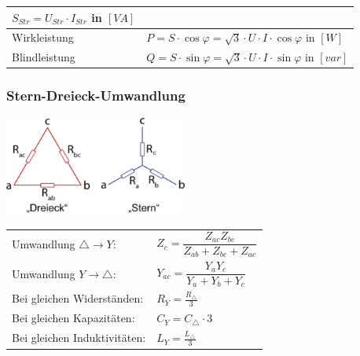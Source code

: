 \begin{tabular}{| p{4.5cm} | l | l |}
            \multicolumn{2}{l|}{\hspace{3cm} $S_{Str} = U_{Str} \cdot I_{Str}$ \hspace{0.2cm} in $[VA]$} \\
            \hline
            Wirkleistung &
            \multicolumn{2}{l|}{\hspace{3cm} $P = S \cdot \cos\varphi = \sqrt{3} \cdot U \cdot I \cdot \cos\varphi$ \hspace{0.2cm} in $[W]$} \\
            \hline
            Blindleistung &
            \multicolumn{2}{l|}{\hspace{3cm} $Q = S \cdot \sin\varphi = \sqrt{3} \cdot U \cdot I \cdot \sin\varphi$ \hspace{0.2cm} in $[var]$} \\
            \hline
        \end{tabular}
        \renewcommand{\arraystretch}{1.5}

    \subsubsection{Stern-Dreieck-Umwandlung}
        \begin{minipage}[lt]{7.5 cm}
            \includegraphics[width=6cm]{images/stern-dreieck.png}
        \end{minipage}
        \begin{minipage}[rt]{9.35 cm} %
            \renewcommand{\arraystretch}{2}
            \begin{tabular}{ll}
                Umwandlung $\triangle \rightarrow Y$: &
                $Z_{c} = \dfrac{Z_{ac} Z_{bc}}{Z_{ab}+Z_{bc}+Z_{ac}}$ \\
                Umwandlung $Y \rightarrow \triangle$: &
                $Y_{ac}=\dfrac{Y_{a} Y_{c}}{Y_{a}+Y_{b}+Y_{c}}$ \\
                Bei gleichen Widerständen: &
                $R_Y = \frac{R_\triangle}{3}$ \\
                Bei gleichen Kapazitäten: &
                $C_Y = C_\triangle \cdot 3 $ \\
                Bei gleichen Induktivitäten: &
                $L_Y = \frac{L_\triangle}{3}$
            \end{tabular}
            \renewcommand{\arraystretch}{1.5}
        \end{minipage}
        
